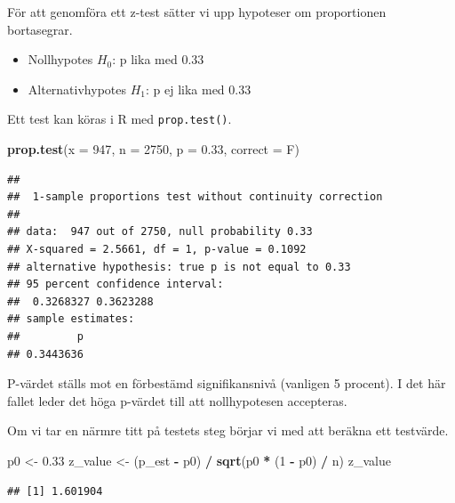 \documentclass[
]{book}
\newenvironment{Shaded}{\begin{snugshade}}{\end{snugshade}}
\newcommand{\AttributeTok}[1]{\textcolor[rgb]{0.13,0.29,0.53}{#1}}
\newcommand{\DecValTok}[1]{\textcolor[rgb]{0.00,0.00,0.81}{#1}}
\newcommand{\FloatTok}[1]{\textcolor[rgb]{0.00,0.00,0.81}{#1}}
\newcommand{\FunctionTok}[1]{\textcolor[rgb]{0.13,0.29,0.53}{\textbf{#1}}}
\newcommand{\NormalTok}[1]{#1}
\newcommand{\OtherTok}[1]{\textcolor[rgb]{0.56,0.35,0.01}{#1}}
\newcommand{\SpecialCharTok}[1]{\textcolor[rgb]{0.81,0.36,0.00}{\textbf{#1}}}
\providecommand{\tightlist}{%
  \setlength{\itemsep}{0pt}\setlength{\parskip}{0pt}}
\theoremstyle{definition}
\theoremstyle{definition}
\theoremstyle{definition}
\theoremstyle{definition}
\theoremstyle{remark}
\begin{document}
För att genomföra ett z-test sätter vi upp hypoteser om proportionen bortasegrar.

\begin{itemize}
\tightlist
\item
  Nollhypotes \(H_0\): p lika med 0.33
\item
  Alternativhypotes \(H_1\): p ej lika med 0.33
\end{itemize}

Ett test kan köras i R med \texttt{prop.test()}.

\begin{Shaded}
\begin{Highlighting}[]
\FunctionTok{prop.test}\NormalTok{(}\AttributeTok{x =} \DecValTok{947}\NormalTok{, }\AttributeTok{n =} \DecValTok{2750}\NormalTok{, }\AttributeTok{p =} \FloatTok{0.33}\NormalTok{, }\AttributeTok{correct =}\NormalTok{ F)}
\end{Highlighting}
\end{Shaded}

\begin{verbatim}
## 
##  1-sample proportions test without continuity correction
## 
## data:  947 out of 2750, null probability 0.33
## X-squared = 2.5661, df = 1, p-value = 0.1092
## alternative hypothesis: true p is not equal to 0.33
## 95 percent confidence interval:
##  0.3268327 0.3623288
## sample estimates:
##         p 
## 0.3443636
\end{verbatim}

P-värdet ställs mot en förbestämd signifikansnivå (vanligen 5 procent). I det här fallet leder det höga p-värdet till att nollhypotesen accepteras.

Om vi tar en närmre titt på testets steg börjar vi med att beräkna ett testvärde.

\begin{Shaded}
\begin{Highlighting}[]
\NormalTok{p0 }\OtherTok{\textless{}{-}} \FloatTok{0.33}
\NormalTok{z\_value }\OtherTok{\textless{}{-}}\NormalTok{ (p\_est }\SpecialCharTok{{-}}\NormalTok{ p0) }\SpecialCharTok{/} \FunctionTok{sqrt}\NormalTok{(p0 }\SpecialCharTok{*}\NormalTok{ (}\DecValTok{1} \SpecialCharTok{{-}}\NormalTok{ p0) }\SpecialCharTok{/}\NormalTok{ n)}
\NormalTok{z\_value}
\end{Highlighting}
\end{Shaded}

\begin{verbatim}
## [1] 1.601904
\end{verbatim}
\end{document}
